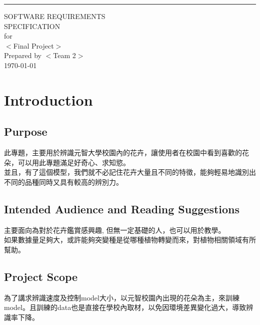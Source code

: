 \documentclass{scrreprt}
\date{}
\begin{document}
\begin{flushright}
    \rule{16cm}{5pt}\vskip1cm
    \begin{bfseries}
        \Huge{SOFTWARE REQUIREMENTS\\ SPECIFICATION}\\
        \vspace{1.9cm}
        for\\
        \vspace{1.9cm}
        $<$Final Project$>$\\
        \vspace{1.9cm}
        Prepared by $<$Team 2$>$\\
        \vspace{1.9cm}
        \today\\
    \end{bfseries}
\end{flushright}

\tableofcontents


\chapter{Introduction}

\section{Purpose}
\begin{CJK}{UTF8}{bkai}
	此專題，主要用於辨識元智大學校園內的花卉，讓使用者在校園中看到喜歡的花朵，可以用此專題滿足好奇心、求知慾。 \\
	並且，有了這個模型，我們就不必記住花卉大量且不同的特徵，能夠輕易地識別出不同的品種同時又具有較高的辨別力。
\end{CJK}

\section{Intended Audience and Reading Suggestions}
\begin{CJK}{UTF8}{bkai}
	主要面向為對於花卉鑑賞感興趣, 但無一定基礎的人，也可以用於教學。\\
如果數據量足夠大，或許能夠突變種是從哪種植物轉變而來，對植物相關領域有所幫助。
\end{CJK}

\section{Project Scope}
\begin{CJK}{UTF8}{bkai}
為了講求辨識速度及控制model大小，以元智校園內出現的花朵為主，來訓練model。且訓練的data也是直接在學校內取材，以免因環境差異變化過大，導致辨識率下降。
\end{CJK}
\end{document}
